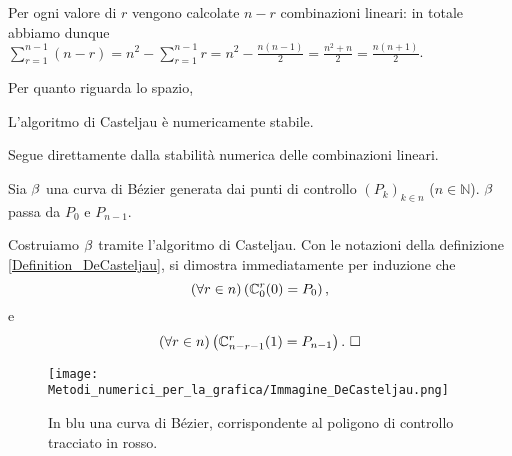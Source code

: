\Proof Per ogni valore di $r$ vengono calcolate $n - r$ combinazioni lineari:
in totale abbiamo dunque
$\sum_{r = 1}^{n - 1} (n - r)
= n^2 - \sum_{r = 1}^{n - 1} r
= n^2 - \frac{n(n - 1)}{2}
= \frac{n^2 + n}{2}
= \frac{n(n + 1)}{2}$.
\par Per quanto riguarda lo spazio,
\begin{Theorem}
  L'algoritmo di Casteljau \`e numericamente stabile.
\end{Theorem}
\Proof Segue direttamente dalla stabilit\`a numerica delle combinazioni lineari.
\EndProof
\begin{Theorem}
  Sia $\beta$ una curva di B\'ezier generata dai punti di controllo
  $(P_k)_{k \in n}$ ($n \in \mathbb{N}$). $\beta$ passa da
  $P_0$ e $P_{n - 1}$.
\end{Theorem}
\Proof Costruiamo $\beta$ tramite l'algoritmo di Casteljau. Con le
notazioni della definizione \ref{Definition_DeCasteljau}, si dimostra
immediatamente per induzione che
\[
  \left ( \forall r \in n \right ) \left ( \mathbb{C}_{0}^{r}(0) = P_0 \right ),
\]
e
\[
  \left ( \forall r \in n \right ) \left ( \mathbb{C}_{n - r - 1}^{r}(1) = P_{n - 1} \right ).\text{ $\square$}
\]
\begin{figure}
	\texttt{[image: Metodi\_numerici\_per\_la\_grafica/Immagine\_DeCasteljau.png]}
	\centering
	\caption[Esempio di curva di B\'ezier]
  {In blu una curva di B\'ezier, corrispondente al poligono di controllo
  tracciato in rosso.}
\end{figure}
